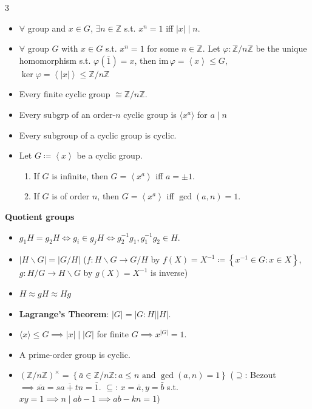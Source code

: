 \documentclass[10pt]{article}
\newcommand{\Z}{\mathbb{Z}} %
\newcommand{\abs}[1]{\left\lvert#1\right\rvert} %
\begin{document}
\begin{multicols*}{3}
\begin{itemize}
            \item $\forall$ group and $x \in G$, $\exists n \in \Z$ s.t. $x^n = 1$ iff $\abs{x} \mid n$.
            \item $\forall$ group $G$ with $x \in G$ s.t. $x^n = 1$ for some $n \in \Z$. Let $\varphi \colon \Z \slash n\Z$ be the unique homomorphism s.t. $\varphi\left(\bar{1}\right) = x$, then $\mathrm{im}\,{\varphi} = \left\langle x \right\rangle \leq G$, $\ker{\varphi} = \left\langle\abs{x}\right\rangle \leq \Z \slash n\Z$ 
            \item Every finite cyclic group $\cong \Z \slash n\Z$.
            \item Every subgrp of an order-$n$ cyclic group is $\langle x^a \rangle$ for $a \mid n$
            \item Every subgroup of a cyclic group is cyclic.
            \item Let $G \coloneqq \left\langle x \right\rangle$ be a cyclic group.
            \begin{enumerate}
                \item If $G$ is infinite, then $G = \left\langle x^a \right\rangle$ iff $a = \pm 1$.
                \item If $G$ is of order $n$, then $G = \left\langle x^a \right\rangle$ iff $\gcd\left(a, n\right) = 1$.
            \end{enumerate}
        \end{itemize}
        \textbf{Quotient groups}
        \begin{itemize}
            \item $g_1H = g_2H \iff g_i \in g_jH \iff g_2^{-1}g_1, g_1^{-1}g_2 \in H$.
            \item $\abs{H \backslash G} = \abs{G \slash H}$ ($f \colon H \backslash G \to G \slash H$ by $f\left(X\right) = X^{-1} \coloneqq \left\{x^{-1} \in G \colon x \in X\right\}$, $g \colon H \slash G \to H \backslash G$ by $g\left(X\right) = X^{-1}$ is inverse)
            \item $H \approx gH \approx Hg$
            \item \textbf{Lagrange's Theorem}: $\abs{G} = \abs{G \colon H}\abs{H}$.
            \item $\langle x \rangle \leq G \implies \abs{x} \mid \abs{G}$ for finite $G \implies x^{\abs{G}} = 1$.
            \item A prime-order group is cyclic.
            \item $\left(\Z \slash n\Z\right)^{\times} = \left\{\bar{a} \in \Z \slash n\Z \colon a \leq n \textrm{ and } \gcd\left(a, n\right) = 1\right\}$ ($\supseteq$: Bezout $\implies \overline{sa} = \overline{sa + tn} = \overline{1}$. $\subseteq$: $x = \bar{a}, y = \bar{b}$ s.t. $xy = 1 \implies n \mid ab - 1 \implies ab - kn = 1$)

\end{itemize}
\end{multicols*}
\end{document}

